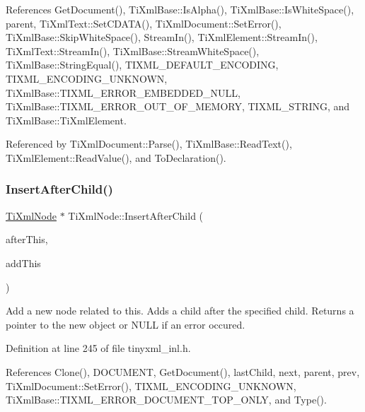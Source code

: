 References Get\+Document(), Ti\+Xml\+Base\+::\+Is\+Alpha(), Ti\+Xml\+Base\+::\+Is\+White\+Space(), parent, Ti\+Xml\+Text\+::\+Set\+C\+D\+A\+T\+A(), Ti\+Xml\+Document\+::\+Set\+Error(), Ti\+Xml\+Base\+::\+Skip\+White\+Space(), Stream\+In(), Ti\+Xml\+Element\+::\+Stream\+In(), Ti\+Xml\+Text\+::\+Stream\+In(), Ti\+Xml\+Base\+::\+Stream\+White\+Space(), Ti\+Xml\+Base\+::\+String\+Equal(), T\+I\+X\+M\+L\+\_\+\+D\+E\+F\+A\+U\+L\+T\+\_\+\+E\+N\+C\+O\+D\+I\+NG, T\+I\+X\+M\+L\+\_\+\+E\+N\+C\+O\+D\+I\+N\+G\+\_\+\+U\+N\+K\+N\+O\+WN, Ti\+Xml\+Base\+::\+T\+I\+X\+M\+L\+\_\+\+E\+R\+R\+O\+R\+\_\+\+E\+M\+B\+E\+D\+D\+E\+D\+\_\+\+N\+U\+LL, Ti\+Xml\+Base\+::\+T\+I\+X\+M\+L\+\_\+\+E\+R\+R\+O\+R\+\_\+\+O\+U\+T\+\_\+\+O\+F\+\_\+\+M\+E\+M\+O\+RY, T\+I\+X\+M\+L\+\_\+\+S\+T\+R\+I\+NG, and Ti\+Xml\+Base\+::\+Ti\+Xml\+Element.



Referenced by Ti\+Xml\+Document\+::\+Parse(), Ti\+Xml\+Base\+::\+Read\+Text(), Ti\+Xml\+Element\+::\+Read\+Value(), and To\+Declaration().

\hypertarget{class_ti_xml_node_a274db3292218202805c093f66a964cb5}{}\label{class_ti_xml_node_a274db3292218202805c093f66a964cb5} 
\subsubsection{\texorpdfstring{Insert\+After\+Child()}{InsertAfterChild()}}
{\footnotesize\ttfamily \hyperlink{class_ti_xml_node}{Ti\+Xml\+Node} $\ast$ Ti\+Xml\+Node\+::\+Insert\+After\+Child (\begin{DoxyParamCaption}\item[{\hyperlink{class_ti_xml_node}{Ti\+Xml\+Node} $\ast$}]{after\+This,  }\item[{const \hyperlink{class_ti_xml_node}{Ti\+Xml\+Node} \&}]{add\+This }\end{DoxyParamCaption})}

Add a new node related to this. Adds a child after the specified child. Returns a pointer to the new object or N\+U\+LL if an error occured. 

Definition at line 245 of file tinyxml\+\_\+inl.\+h.



References Clone(), D\+O\+C\+U\+M\+E\+NT, Get\+Document(), last\+Child, next, parent, prev, Ti\+Xml\+Document\+::\+Set\+Error(), T\+I\+X\+M\+L\+\_\+\+E\+N\+C\+O\+D\+I\+N\+G\+\_\+\+U\+N\+K\+N\+O\+WN, Ti\+Xml\+Base\+::\+T\+I\+X\+M\+L\+\_\+\+E\+R\+R\+O\+R\+\_\+\+D\+O\+C\+U\+M\+E\+N\+T\+\_\+\+T\+O\+P\+\_\+\+O\+N\+LY, and Type().



